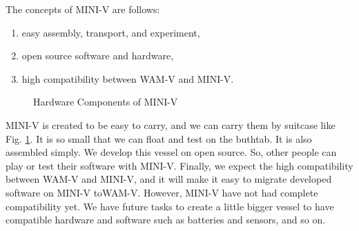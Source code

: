 \documentclass[lettersize,journal]{IEEEtran}
\begin{document}
The concepts of MINI-V are follows:
\begin{enumerate}
  \item easy assembly, transport, and experiment,
  \item open source software and hardware,
  \item high compatibility between WAM-V and MINI-V.
\end{enumerate}

\begin{figure}[H]
    \begin{center}
    \end{center}
    \caption{Hardware Components of MINI-V}
    \label{fig:mini_v_component}
\end{figure}

MINI-V is created to be easy to carry, and we can carry them by suitcase like Fig. \ref{fig:mini_v_component}. It is so small that we can
float and test on the buthtab.
It is also assembled simply. We develop this vessel on open source. So, other people can play or test their software with MINI-V. Finally,
we expect the high compatibility between WAM-V and MINI-V, and it will make it easy to migrate developed software on MINI-V toWAM-V. However, 
MINI-V have not had complete compatibility yet.
We have future tasks to create a little bigger vessel to have compatible hardware and software such as batteries and sensors, and so on.
  
\end{document}
